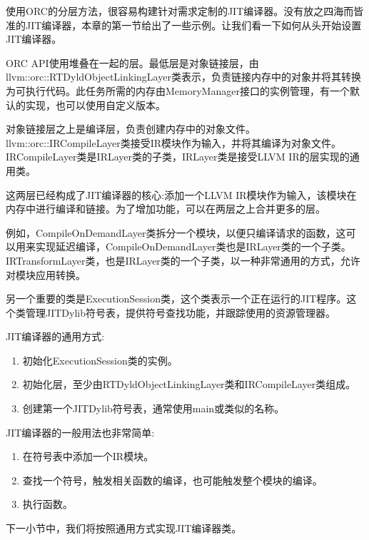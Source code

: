 
使用ORC的分层方法，很容易构建针对需求定制的JIT编译器。没有放之四海而皆准的JIT编译器，本章的第一节给出了一些示例。让我们看一下如何从头开始设置JIT编译器。

ORC API使用堆叠在一起的层。最低层是对象链接层，由llvm::orc::RTDyldObjectLinkingLayer类表示，负责链接内存中的对象并将其转换为可执行代码。此任务所需的内存由MemoryManager接口的实例管理，有一个默认的实现，也可以使用自定义版本。

对象链接层之上是编译层，负责创建内存中的对象文件。llvm::orc::IRCompileLayer类接受IR模块作为输入，并将其编译为对象文件。IRCompileLayer类是IRLayer类的子类，IRLayer类是接受LLVM IR的层实现的通用类。

这两层已经构成了JIT编译器的核心:添加一个LLVM IR模块作为输入，该模块在内存中进行编译和链接。为了增加功能，可以在两层之上合并更多的层。

例如，CompileOnDemandLayer类拆分一个模块，以便只编译请求的函数，这可以用来实现延迟编译，CompileOnDemandLayer类也是IRLayer类的一个子类。IRTransformLayer类，也是IRLayer类的一个子类，以一种非常通用的方式，允许对模块应用转换。

另一个重要的类是ExecutionSession类，这个类表示一个正在运行的JIT程序。这个类管理JITDylib符号表，提供符号查找功能，并跟踪使用的资源管理器。

JIT编译器的通用方式:

\begin{enumerate}
\item
初始化ExecutionSession类的实例。

\item
初始化层，至少由RTDyldObjectLinkingLayer类和IRCompileLayer类组成。

\item
创建第一个JITDylib符号表，通常使用main或类似的名称。
\end{enumerate}

JIT编译器的一般用法也非常简单:

\begin{enumerate}
\item
在符号表中添加一个IR模块。

\item
查找一个符号，触发相关函数的编译，也可能触发整个模块的编译。

\item
执行函数。
\end{enumerate}

下一小节中，我们将按照通用方式实现JIT编译器类。


